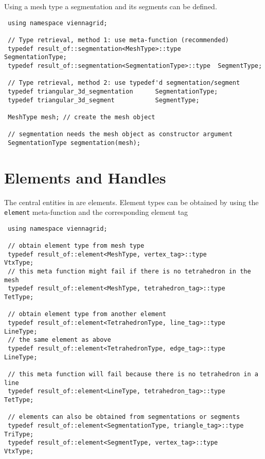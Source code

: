 Using a mesh type a segmentation and its segments can be defined.

\begin{lstlisting}
 using namespace viennagrid;

 // Type retrieval, method 1: use meta-function (recommended)
 typedef result_of::segmentation<MeshType>::type        SegmentationType;
 typedef result_of::segmentation<SegmentationType>::type  SegmentType;

 // Type retrieval, method 2: use typedef'd segmentation/segment
 typedef triangular_3d_segmentation      SegmentationType;
 typedef triangular_3d_segment           SegmentType;

 MeshType mesh; // create the mesh object

 // segmentation needs the mesh object as constructor argument
 SegmentationType segmentation(mesh);
\end{lstlisting}

\pagebreak

\section{Elements and Handles} \label{sec:elements-and-handles}

The central entities in {\ViennaGrid} are elements. Element types can be obtained by using the \lstinline|element| meta-function and the corresponding element tag

\begin{lstlisting}
 using namespace viennagrid;

 // obtain element type from mesh type
 typedef result_of::element<MeshType, vertex_tag>::type         VtxType;
 // this meta function might fail if there is no tetrahedron in the mesh
 typedef result_of::element<MeshType, tetrahedron_tag>::type    TetType;

 // obtain element type from another element
 typedef result_of::element<TetrahedronType, line_tag>::type      LineType;
 // the same element as above
 typedef result_of::element<TetrahedronType, edge_tag>::type      LineType;

 // this meta function will fail because there is no tetrahedron in a line
 typedef result_of::element<LineType, tetrahedron_tag>::type      TetType;

 // elements can also be obtained from segmentations or segments
 typedef result_of::element<SegmentationType, triangle_tag>::type TriType;
 typedef result_of::element<SegmentType, vertex_tag>::type        VtxType;
\end{lstlisting}


